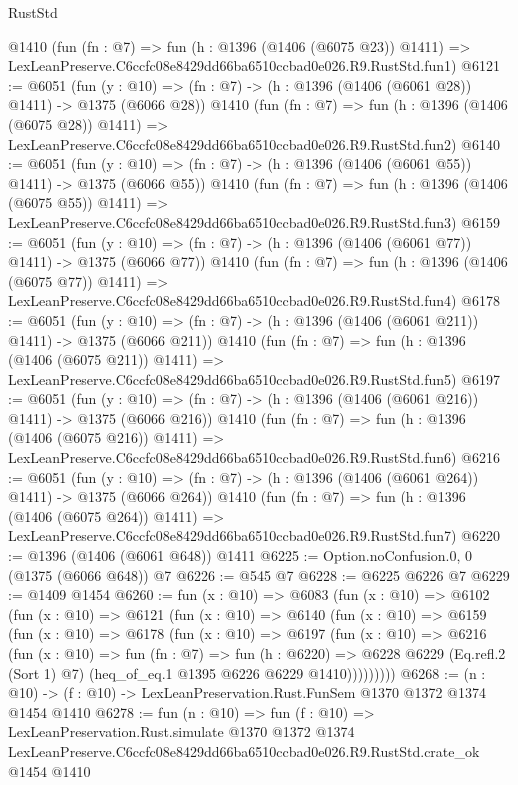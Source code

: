 \begin{lexlean}{RustStd}
\begin{coremodule}
    @1410
    (fun (fn : @7) =>
    fun (h : @1396 (@1406 (@6075 @23)) @1411) =>
    LexLeanPreserve.C6ccfc08e8429dd66ba6510ccbad0e026.R9.RustStd.fun1)
@6121 := @6051
    (fun (y : @10) => (fn : @7) -> (h : @1396 (@1406 (@6061 @28)) @1411) -> @1375 (@6066 @28))
    @1410
    (fun (fn : @7) =>
    fun (h : @1396 (@1406 (@6075 @28)) @1411) =>
    LexLeanPreserve.C6ccfc08e8429dd66ba6510ccbad0e026.R9.RustStd.fun2)
@6140 := @6051
    (fun (y : @10) => (fn : @7) -> (h : @1396 (@1406 (@6061 @55)) @1411) -> @1375 (@6066 @55))
    @1410
    (fun (fn : @7) =>
    fun (h : @1396 (@1406 (@6075 @55)) @1411) =>
    LexLeanPreserve.C6ccfc08e8429dd66ba6510ccbad0e026.R9.RustStd.fun3)
@6159 := @6051
    (fun (y : @10) => (fn : @7) -> (h : @1396 (@1406 (@6061 @77)) @1411) -> @1375 (@6066 @77))
    @1410
    (fun (fn : @7) =>
    fun (h : @1396 (@1406 (@6075 @77)) @1411) =>
    LexLeanPreserve.C6ccfc08e8429dd66ba6510ccbad0e026.R9.RustStd.fun4)
@6178 := @6051
    (fun (y : @10) => (fn : @7) -> (h : @1396 (@1406 (@6061 @211)) @1411) -> @1375 (@6066 @211))
    @1410
    (fun (fn : @7) =>
    fun (h : @1396 (@1406 (@6075 @211)) @1411) =>
    LexLeanPreserve.C6ccfc08e8429dd66ba6510ccbad0e026.R9.RustStd.fun5)
@6197 := @6051
    (fun (y : @10) => (fn : @7) -> (h : @1396 (@1406 (@6061 @216)) @1411) -> @1375 (@6066 @216))
    @1410
    (fun (fn : @7) =>
    fun (h : @1396 (@1406 (@6075 @216)) @1411) =>
    LexLeanPreserve.C6ccfc08e8429dd66ba6510ccbad0e026.R9.RustStd.fun6)
@6216 := @6051
    (fun (y : @10) => (fn : @7) -> (h : @1396 (@1406 (@6061 @264)) @1411) -> @1375 (@6066 @264))
    @1410
    (fun (fn : @7) =>
    fun (h : @1396 (@1406 (@6075 @264)) @1411) =>
    LexLeanPreserve.C6ccfc08e8429dd66ba6510ccbad0e026.R9.RustStd.fun7)
@6220 := @1396 (@1406 (@6061 @648)) @1411
@6225 := Option.noConfusion.{0, 0} (@1375 (@6066 @648)) @7
@6226 := @545 @7
@6228 := @6225 @6226 @7
@6229 := @1409 @1454
@6260 := fun (x : @10) =>
  @6083
    (fun (x : @10) =>
    @6102
      (fun (x : @10) =>
      @6121
        (fun (x : @10) =>
        @6140
          (fun (x : @10) =>
          @6159
            (fun (x : @10) =>
            @6178
              (fun (x : @10) =>
              @6197
                (fun (x : @10) =>
                @6216
                  (fun (x : @10) =>
                  fun (fn : @7) =>
                  fun (h : @6220) =>
                  @6228
                    @6229
                    (Eq.refl.{2} (Sort 1) @7)
                    (heq_of_eq.{1} @1395 @6226 @6229 @1410)))))))))
@6268 := (n : @10) -> (f : @10) -> LexLeanPreservation.Rust.FunSem @1370 @1372 @1374 @1454 @1410
@6278 := fun (n : @10) =>
  fun (f : @10) =>
  LexLeanPreservation.Rust.simulate
    @1370
    @1372
    @1374
    LexLeanPreserve.C6ccfc08e8429dd66ba6510ccbad0e026.R9.RustStd.crate_ok
    @1454
    @1410
\end{coremodule}
\end{lexlean}
